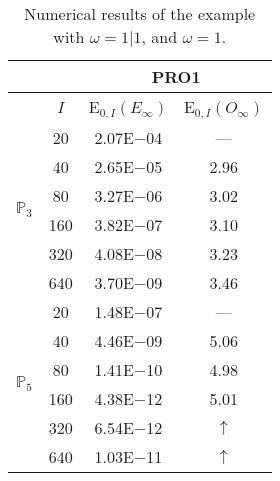 \begin{table}[H]
\caption{Numerical results of the example with $\omega=1|1$, and $\omega=1$.}
\setlength{\tabcolsep}{5pt}
\centering
\begin{tabular}{@{}l c c c@{}}
\toprule
 &  & \multicolumn{2}{c}{PRO1}\\
\midrule
 & $I$ & E$_{0,I}(E_{\infty})$ & E$_{0,I}(O_{\infty})$\\
\midrule
\multirow{6}{*}{$\mathbb{P}_{3}$}
 & 20 & 2.07E$-$04 & ---\\
 & 40 & 2.65E$-$05 & 2.96\\
 & 80 & 3.27E$-$06 & 3.02\\
 & 160 & 3.82E$-$07 & 3.10\\
 & 320 & 4.08E$-$08 & 3.23\\
 & 640 & 3.70E$-$09 & 3.46\\
\midrule
\multirow{6}{*}{$\mathbb{P}_{5}$}
 & 20 & 1.48E$-$07 & ---\\
 & 40 & 4.46E$-$09 & 5.06\\
 & 80 & 1.41E$-$10 & 4.98\\
 & 160 & 4.38E$-$12 & 5.01\\
 & 320 & 6.54E$-$12 & $\uparrow$\\
 & 640 & 1.03E$-$11 & $\uparrow$\\
\bottomrule
\end{tabular}
\label{Table:PRO:test_01_01_test45_pro1}
\end{table}
